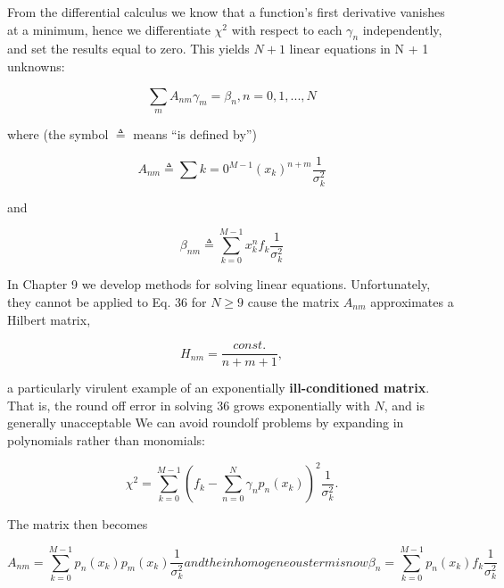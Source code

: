 From the differential calculus we know that a function's first derivative vanishes at a minimum, hence we differentiate $\chi^{2}$ with respect to each $\gamma_{n}$ independently, and set the results equal to zero. This yields $N + 1$ linear equations in N + 1 unknowns:

\begin{equation}
\sum_{m} A_{nm} \gamma_{m} = \beta_{n}, n = 0, 1, ... , N
\end{equation}

where (the symbol $\triangleq$ means “is defined by”)

\begin{equation}
A_{nm} \triangleq \sum{k=0}^{M-1}(x_{k})^{n+m} \frac{1}{\sigma_{k}^{2}}
\end{equation}

and

\begin{equation}
\beta_{nm} \triangleq \sum_{k=0}^{M-1}x_{k}^{n}f_{k}\frac{1}{\sigma_{k}^{2}}
\end{equation}

In Chapter 9 we develop methods for solving linear equations. Unfortunately, they cannot be applied to Eq. 36 for $N \geq 9$ cause the matrix $A_{nm}$ approximates a Hilbert matrix,

\begin{equation}
H_{nm} = \frac{const.}{n+m+1} ,
\end{equation}

a particularly virulent example of an exponentially \textbf{ill-conditioned matrix}. That is, the round off error in solving 36 grows exponentially with $N$, and is generally unacceptable We can avoid roundolf problems by expanding in polynomials rather than monomials:

\begin{equation}\label{eq:08_38}
\chi^{2} = \sum_{k=0}^{M-1} (f_{k} - \sum_{n=0}^{N} \gamma_{n}p_{n}(x_{k}) )^2 \frac{1}{\sigma_{k}^{2}} .
\end{equation}

The matrix then becomes

\begin{subequations}
    \begin{equation}\label{eq:08_39a}
    A_{nm} = \sum_{k=0}^{M-1} p_{n}(x_{k})p_{m}(x_{k}) \frac{1}{\sigma_{k}^{2}}
    \end{equation}
and the inhomogeneous term is now
    \begin{equation}
    \beta_{n} = \sum_{k=0}^{M-1} p_{n}(x_{k})f_{k} \frac{1}{\sigma_{k}^{2}}
    \end{equation}
\end{subequations}

